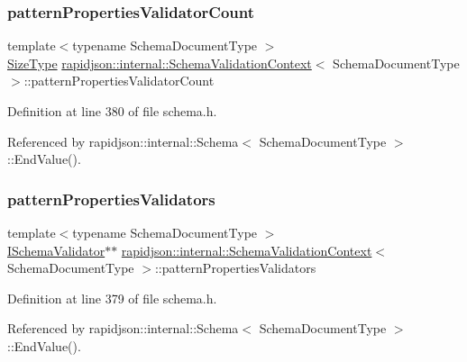 \subsubsection{\texorpdfstring{patternPropertiesValidatorCount}{patternPropertiesValidatorCount}}
{\footnotesize\ttfamily template$<$typename Schema\+Document\+Type $>$ \\
\mbox{\hyperlink{namespacerapidjson_a44eb33eaa523e36d466b1ced64b85c84}{Size\+Type}} \mbox{\hyperlink{structrapidjson_1_1internal_1_1_schema_validation_context}{rapidjson\+::internal\+::\+Schema\+Validation\+Context}}$<$ Schema\+Document\+Type $>$\+::pattern\+Properties\+Validator\+Count}



Definition at line 380 of file schema.\+h.



Referenced by rapidjson\+::internal\+::\+Schema$<$ Schema\+Document\+Type $>$\+::\+End\+Value().

\mbox{\label{structrapidjson_1_1internal_1_1_schema_validation_context_ac1ef51413d015e814223227170831ca5}} 
\subsubsection{\texorpdfstring{patternPropertiesValidators}{patternPropertiesValidators}}
{\footnotesize\ttfamily template$<$typename Schema\+Document\+Type $>$ \\
\mbox{\hyperlink{classrapidjson_1_1internal_1_1_i_schema_validator}{I\+Schema\+Validator}}$\ast$$\ast$ \mbox{\hyperlink{structrapidjson_1_1internal_1_1_schema_validation_context}{rapidjson\+::internal\+::\+Schema\+Validation\+Context}}$<$ Schema\+Document\+Type $>$\+::pattern\+Properties\+Validators}



Definition at line 379 of file schema.\+h.



Referenced by rapidjson\+::internal\+::\+Schema$<$ Schema\+Document\+Type $>$\+::\+End\+Value().

